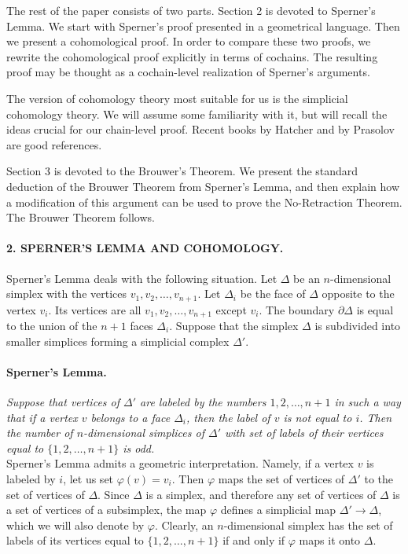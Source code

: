 \documentclass[leqno, 11pt]{article}\usepackage{latexsym}\usepackage{amsmath, amscd}\usepackage{amssymb}
\begin{document}
The rest of the paper consists of two parts. Section 2 is devoted to Sperner's Lemma. 
We start with Sperner's proof presented in a geometrical language. Then we present a cohomological proof. 
In order to compare these two proofs, we rewrite the cohomological proof explicitly in terms of cochains. 
The resulting proof may be thought as a cochain-level realization of Sperner's arguments.

The version of cohomology theory most suitable for us is the simplicial cohomology theory. We will assume some familiarity with it, 
but will recall the ideas crucial for our chain-level proof. 
Recent books by Hatcher \cite{H} and by Prasolov \cite{P2} are good references. 

Section 3 is devoted to the Brouwer's Theorem. We present the standard deduction of the Brouwer Theorem from Sperner's Lemma, and then explain how a modification
of this argument can be used to prove the No-Retraction Theorem. The Brouwer Theorem follows.

\paragraph*{2. SPERNER'S LEMMA AND COHOMOLOGY.} Sperner's Lemma deals with the following situation. Let $\Delta$ be an $n$-dimensional simplex with the vertices $v_1, v_2,\ldots, v_{n+1}$. Let $\Delta_i$ be the face of $\Delta$ opposite to the vertex $v_i$. Its vertices are all $v_1,v_2,\ldots,v_{n+1}$ except $v_i$. The boundary $\partial\Delta$ is equal to the union of the $n+1$ faces $\Delta_i$. Suppose that the simplex $\Delta$ is subdivided into smaller simplices forming a simplicial complex $\Delta'$.

\paragraph{Sperner's Lemma.} {\em Suppose that vertices of $\Delta'$ are labeled by the numbers $1,2,\ldots, n+1$ in such a way that if a vertex $v$ belongs to a face $\Delta_i$, then the label of $v$ is not equal to $i$. Then the number of $n$-dimensional simplices of $\Delta'$ with set of labels of their vertices equal to  $\{1,2,\ldots, n+1\}$ is odd.}\\

Sperner's Lemma admits a geometric interpretation. Namely, if a vertex $v$ is labeled by $i$, let us set $\varphi(v)=v_i$. Then $\varphi$ maps the set of vertices of $\Delta'$ to the set of vertices of $\Delta$. Since $\Delta$ is a simplex, and therefore any set of vertices of $\Delta$ is a set of vertices of a subsimplex, the map $\varphi$ defines a simplicial map $\Delta'\rightarrow\Delta$, which we will also denote by $\varphi$. Clearly, an $n$-dimensional simplex has 
the set of labels of its vertices equal to  $\{1,2,\ldots, n+1\}$ if and only if $\varphi$ maps it onto $\Delta$. 
\end{document}
